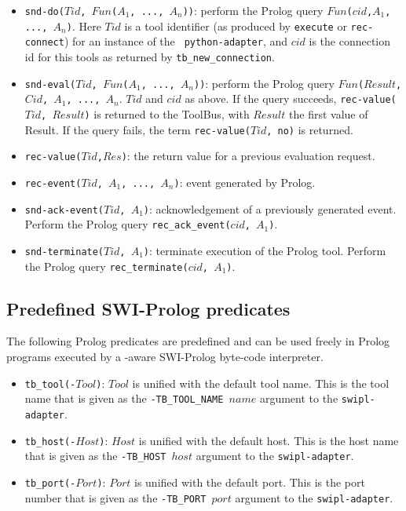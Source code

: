 {\begin{itemize}
\item {\tt snd-do($Tid$, $Fun$($A_1$, ..., $A_n$))}: perform the Prolog
query
{\tt $Fun$($cid$,$A_1$, ..., $A_n$)}. Here $Tid$ is a tool identifier
(as produced by {\tt execute} or {\tt rec-connect}) for an instance of the {\tt
python-adapter}, and $cid$ is the connection id for this tools as returned
by {\tt tb\_new\_connection}.
\item {\tt snd-eval($Tid$, $Fun$($A_1$, ..., $A_n$))}: perform the Prolog
query
{\tt $Fun$($Result$,$Cid$, $A_1$, ..., $A_n$}. $Tid$ and $cid$ as above.
If the query succeeds, {\tt rec-value($Tid$, $Result$)} is returned
to the ToolBus, with $Result$ the first value of Result.
If the query fails, the term {\tt rec-value($Tid$, no)}
is returned.
\item {\tt rec-value($Tid$,$Res$)}: the return value for a previous evaluation request.
\item {\tt rec-event($Tid$, $A_1$, ..., $A_n$)}: event generated by Prolog.
\item {\tt snd-ack-event($Tid$, $A_1$)}: acknowledgement of
a previously generated event. Perform the Prolog query
{\tt rec\_ack\_event($cid$, $A_1$)}.
\item {\tt snd-terminate($Tid$, $A_1$)}: terminate execution of the
Prolog tool. Perform the Prolog query
{\tt rec\_terminate($cid$, $A_1$)}.
\end{itemize}


\subsection{\label{Prolog-predicates}Predefined SWI-Prolog predicates}
The following Prolog predicates are predefined and can be used freely in
Prolog programs executed by a \TB -aware SWI-Prolog byte-code interpreter.

\begin{itemize}

\item {\tt tb\_tool(-$Tool$)}: $Tool$ is unified with the default tool name.
      This is the tool name that is given as the {\tt -TB\_TOOL\_NAME $name$}
      argument to the {\tt swipl-adapter}.

\item {\tt tb\_host(-$Host$)}: $Host$ is unified with the default host.
      This is the host name that is given as the {\tt -TB\_HOST $host$}
      argument to the {\tt swipl-adapter}.

\item {\tt tb\_port(-$Port$)}: $Port$ is unified with the default port.
      This is the port number that is given as the {\tt -TB\_PORT $port$}
      argument to the {\tt swipl-adapter}.


\end{itemize}}
